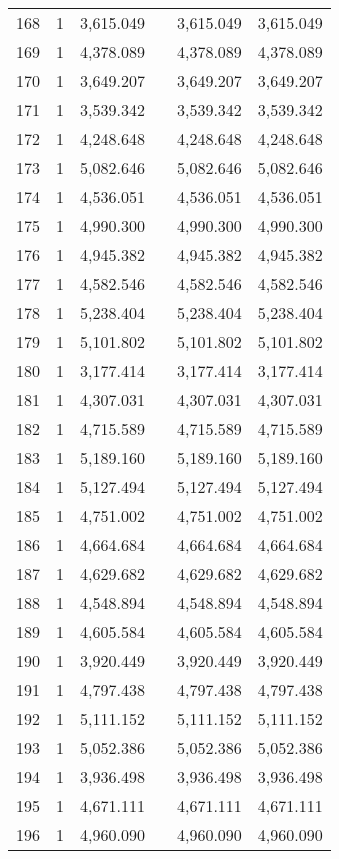 \begin{table}[!htbp]
\begin{tabular}{@{\extracolsep{5pt}}lccccc}
168 & 1 & 3,615.049 &  & 3,615.049 & 3,615.049 \\ 
169 & 1 & 4,378.089 &  & 4,378.089 & 4,378.089 \\ 
170 & 1 & 3,649.207 &  & 3,649.207 & 3,649.207 \\ 
171 & 1 & 3,539.342 &  & 3,539.342 & 3,539.342 \\ 
172 & 1 & 4,248.648 &  & 4,248.648 & 4,248.648 \\ 
173 & 1 & 5,082.646 &  & 5,082.646 & 5,082.646 \\ 
174 & 1 & 4,536.051 &  & 4,536.051 & 4,536.051 \\ 
175 & 1 & 4,990.300 &  & 4,990.300 & 4,990.300 \\ 
176 & 1 & 4,945.382 &  & 4,945.382 & 4,945.382 \\ 
177 & 1 & 4,582.546 &  & 4,582.546 & 4,582.546 \\ 
178 & 1 & 5,238.404 &  & 5,238.404 & 5,238.404 \\ 
179 & 1 & 5,101.802 &  & 5,101.802 & 5,101.802 \\ 
180 & 1 & 3,177.414 &  & 3,177.414 & 3,177.414 \\ 
181 & 1 & 4,307.031 &  & 4,307.031 & 4,307.031 \\ 
182 & 1 & 4,715.589 &  & 4,715.589 & 4,715.589 \\ 
183 & 1 & 5,189.160 &  & 5,189.160 & 5,189.160 \\ 
184 & 1 & 5,127.494 &  & 5,127.494 & 5,127.494 \\ 
185 & 1 & 4,751.002 &  & 4,751.002 & 4,751.002 \\ 
186 & 1 & 4,664.684 &  & 4,664.684 & 4,664.684 \\ 
187 & 1 & 4,629.682 &  & 4,629.682 & 4,629.682 \\ 
188 & 1 & 4,548.894 &  & 4,548.894 & 4,548.894 \\ 
189 & 1 & 4,605.584 &  & 4,605.584 & 4,605.584 \\ 
190 & 1 & 3,920.449 &  & 3,920.449 & 3,920.449 \\ 
191 & 1 & 4,797.438 &  & 4,797.438 & 4,797.438 \\ 
192 & 1 & 5,111.152 &  & 5,111.152 & 5,111.152 \\ 
193 & 1 & 5,052.386 &  & 5,052.386 & 5,052.386 \\ 
194 & 1 & 3,936.498 &  & 3,936.498 & 3,936.498 \\ 
195 & 1 & 4,671.111 &  & 4,671.111 & 4,671.111 \\ 
196 & 1 & 4,960.090 &  & 4,960.090 & 4,960.090 \\ 

\end{tabular}
\end{table}
